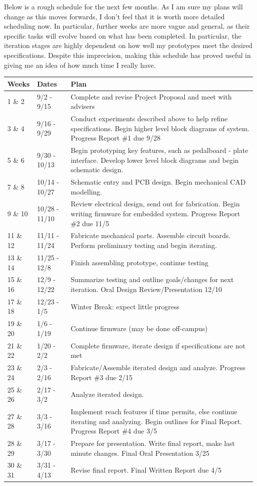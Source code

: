 \documentclass{article}
\begin{document}
Below is a rough schedule for the next few months.  As I am sure my plans will change as this moves forwards, I don't feel that it is worth more detailed scheduling now.  In particular, further weeks are more vague and general, as their specific tasks will evolve based on what has been completed.  In particular, the iteration stages are highly dependent on how well my prototypes meet the desired specifications.  Despite this imprecision, making this schedule has proved useful in giving me an idea of how much time I really have.


\begin{table}[h!]
\begin{tabular}{llp{4in}}
Weeks    & Dates         & Plan \\
\hline
1 \& 2   & 9/2 - 9/15    &  Complete and revise Project Proposal and meet with advisers      \\
3 \& 4   & 9/16 - 9/29   &  Conduct experiments described above to help refine specifications.  Begin higher level block diagrams of system.  Progress Report \#1 due 9/28    \\
5 \& 6   & 9/30 - 10/13  &  Begin prototyping key features, such as pedalboard - plate interface.  Develop lower level block diagrams and begin schematic design.    \\
7 \& 8   & 10/14 - 10/27 &  Schematic entry and PCB design.  Begin mechanical CAD modelling.    \\
9 \& 10  & 10/28 - 11/10 &  Review electrical design, send out for fabrication.  Begin writing firmware for embedded system.  Progress Report \#2 due 11/5    \\
11 \& 12 & 11/11 - 11/24 &  Fabricate mechanical parts.  Assemble circuit boards.  Perform preliminary testing and begin iterating.    \\
13 \& 14 & 11/25 - 12/8  &  Finish assembling prototype, continue testing     \\
15 \& 16 & 12/9 - 12/22  &  Summarize testing and outline goals/changes for next iteration.  Oral Design Review/Presentation 12/10    \\
17 \& 18 & 12/23 - 1/5   &  Winter Break: expect little progress    \\
19 \& 20 & 1/6 - 1/19    &  Continue firmware (may be done off-campus)    \\
21 \& 22 & 1/20 - 2/2    &  Complete firmware, iterate design if specifications are not met   \\
23 \& 24 & 2/3 - 2/16    &  Fabricate/Assemble iterated design and analyze.  Progress Report \#3 due 2/15    \\
25 \& 26 & 2/17 - 3/2    &  Analyze iterated design.    \\
27 \& 28 & 3/3 - 3/16    &  Implement reach features if time permits, else continue iterating and analyzing.  Begin outlines for Final Report.  Progress Report \#4 due 3/5   \\
28 \& 29 & 3/17 - 3/30   &  Prepare for presentation.  Write final report, make last minute changes.  Final Oral Presentation 3/25  \\
30 \& 31 & 3/31 - 4/13   &  Revise final report.  Final Written Report due 4/5    
\end{tabular}
\end{table}
\end{document}
